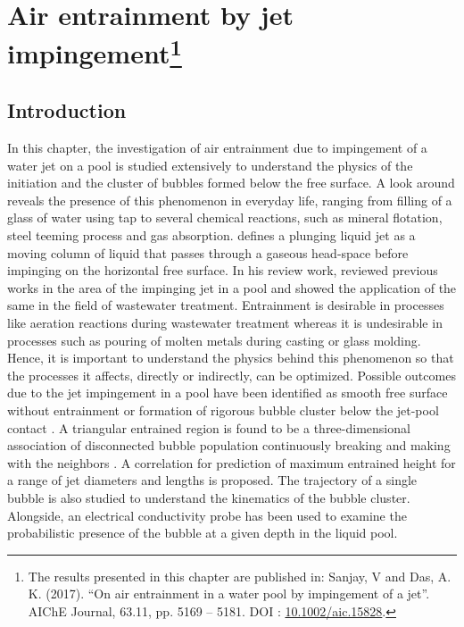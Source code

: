 \chapter[Air entrainment by impingement of liquid jet on a pool]{Air entrainment by jet impingement\footnote{The results presented in this chapter are published in: Sanjay, V and Das, A. K. (2017). \textquotedblleft On air entrainment in a water pool by impingement of a jet\textquotedblright. AIChE Journal, 63.11, pp. 5169 -- 5181. DOI : \href{https://onlinelibrary.wiley.com/doi/abs/10.1002/aic.15828}{\color{black}10.1002/aic.15828}.}}\label{Chapter::BubbleEntrainment}
\section{Introduction}
In this chapter, the investigation of air entrainment due to impingement of a water jet on a pool is studied extensively to understand the physics of the initiation and the cluster of bubbles formed below the free surface. A look around reveals the presence of this phenomenon in everyday life, ranging from filling of a glass of water using tap to several chemical reactions, such as mineral flotation, steel teeming process and gas absorption. \citet{Evans1996} defines a plunging liquid jet as a moving column of liquid that passes through a gaseous head-space before impinging on the horizontal free surface. In his review work, \citet{Bin1993} reviewed previous works in the area of the impinging jet in a pool and showed the application of the same in the field of wastewater treatment. Entrainment is desirable in processes like aeration reactions during wastewater treatment whereas it is undesirable in processes such as pouring of molten metals during casting or glass molding. Hence, it is important to understand the physics behind this phenomenon so that the processes it affects, directly or indirectly, can be optimized. Possible outcomes due to the jet impingement in a pool have been identified as smooth free surface without entrainment or formation of rigorous bubble cluster below the jet-pool contact \citep{Roy2013}. A triangular entrained region is found to be a three-dimensional association of disconnected bubble population continuously breaking and making with the neighbors \citep{Belden2012,Harby2014,Bagatur2014}. A correlation for prediction of maximum entrained height for a range of jet diameters and lengths is proposed. The trajectory of a single bubble is also studied to understand the kinematics of the bubble cluster. Alongside, an electrical conductivity probe has been used to examine the probabilistic presence of the bubble at a given depth in the liquid pool. 
